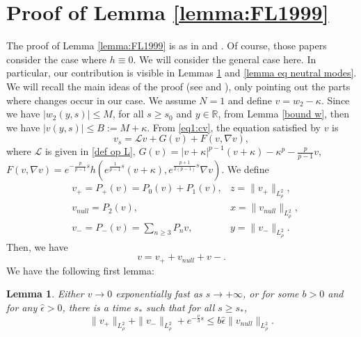 \documentclass[11pt,a4paper]{article}
\newcommand{\1}{\mathbbm{1}}
\numberwithin{equation}{section}
\newcommand{\numberset}{\mathbb}
\newcommand{\R}{\numberset{R}}
\newtheorem{lemma}{Lemma}[section]
\theoremstyle{remark}
\begin{document}
\appendix 


\section{Proof of Lemma \ref{lemma:FL1999}}\label{Lemma FK1999}
The proof of Lemma \ref{lemma:FL1999} is as in \cite{FK1992} and \cite{FL1993}. Of course, those papers consider the case where $h\equiv 0$. We will consider the general case here. In particular, our contribution is visible in Lemmas \ref{lemma eq v+,v-,v null} and \ref{lemma eq neutral modes}. We will recall the main ideas of the proof (see \cite[Section 4 and 5]{FK1992} and \cite[Proposition 4.1]{FL1993}), only pointing out the parts where changes occur in our case. We assume $N=1$ and define $v=w_2-\kappa$. Since we have $|w_2(y,s)|\leq M$, for all $s\geq s_0$ and $y\in\R$, from Lemma \ref{bound w}, then we have $|v(y,s)|\leq B:=M+\kappa$. From \eqref{eq1:cv}, the equation satisfied by $v$ is 
\begin{equation}\label{eq v Append}
v_s=\mathcal{L}v+G(v)+F(v,\nabla v),
\end{equation}
where $\mathcal{L}$ is given in \eqref{def op L}, $G(v)=|v+\kappa|^{p-1}(v+\kappa)-\kappa^p-\frac{p}{p-1}v$, $F(v,\nabla v)=e^{-\frac{p}{p-1}s}h(e^{\frac{1}{p-1}s}(v+\kappa),e^{\frac{p+1}{2(p-1)}s}\nabla v)$. We define 
\begin{align}\label{x y z}
&v_+=P_+(v)=P_0(v)+P_1(v),&z=\|v_+\|_{L^2_\rho},\\
&v_{null}=P_2(v),&x=\|v_{null}\|_{L^2_\rho},\\
&v_-=P_-(v)=\underset{n\geq 3}{\sum}P_nv,&y=\|v_-\|_{L^2_\rho}.
\end{align}
Then, we have
\begin{equation}\label{decomposition v}
    v=v_++v_{null}+v-.
\end{equation}
We have the following first lemma:
\begin{lemma}\label{lemma eq v+,v-,v null}
Either $v \rightarrow 0$ exponentially fast as $s \rightarrow +\infty$, or for some $b>0$ and for any $\widehat \epsilon > 0$, there is a time $s_*$ such that for all $s\geq s_*$,
\begin{equation}\label{generic behavior}
\|v_+\|_{L^2_\rho}+\|v_-\|_{L^2_\rho}+e^{-\frac{\nu}{3}s}\leq b\widehat{\epsilon}\|v_{null}\|_{L^2_\rho}.
\end{equation}
\end{lemma}
\end{document}
